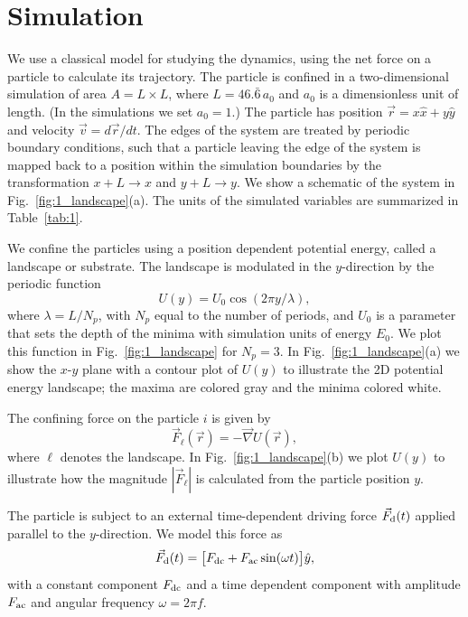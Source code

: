 \documentclass[preprint,showpacs,preprintnumbers,amsmath,amssymb,aps,prb]{revtex4-1}
\theoremstyle{remark}
\begin{document}
\section{Simulation}
\label{sec:MD}
We use a classical model for 
studying the dynamics, 
using the net force on a particle to calculate
its trajectory.
The particle is confined in a two-dimensional 
simulation of area $A = L \times L$, where $L=46.\bar{6}\,a_0$
and $a_0$ is a dimensionless unit of length. (In the simulations we   set $a_0 = 1$.)
The particle 
has
position $\vec{r} = x \hat{x} + y \hat{y}$
and velocity $\vec{v} = d\vec{r}/dt$.
The edges of the system are treated by
periodic boundary conditions,
such that a particle leaving the edge of the system is mapped
back to a position within the simulation boundaries 
by the transformation $x+L \rightarrow x$ and $y+L \rightarrow y$.
We show a schematic of the system in Fig.~\ref{fig:1_landscape}(a).
The units of the simulated variables are summarized in Table~\ref{tab:1}.

We confine the particles using a position dependent 
potential energy, called a landscape or substrate.
The landscape is modulated in the $y$-direction
by the periodic function 
 \begin{equation}
   U(y) = U_0 \cos{(2 \pi y / \lambda)},
     \label{eq:ysubstrate}
\end{equation}
where $\lambda=L/N_p$, with $N_p$ equal to the number of periods,
and $U_0$ is a parameter
 that sets the depth of the minima
 with simulation units of energy $E_0$. 
 We plot this function in 
 Fig.~\ref{fig:1_landscape}
 for $N_p = 3$.  In Fig.~\ref{fig:1_landscape}(a) we show 
 the $x$-$y$ plane with a contour plot of $U(y)$ 
 to illustrate
 the 2D potential energy landscape;
 the maxima are colored gray and the minima colored white.

The confining force on the particle $i$
 is given by
 \begin{equation}
 \vec{F}_{\ell}(\vec{r}) = - \vec \nabla U(\vec{r}),
 \label{eq:dudr}
 \end{equation}
where $\ell$ denotes the landscape.
 In Fig.~\ref{fig:1_landscape}(b) we plot  
 $U(y)$ to illustrate how the magnitude
 $|\vec{F}_{\ell}|$ is calculated from the particle position $y$.
 
The particle is subject to an external time-dependent driving force
$\vec{F}_{\rm d}(t)$
applied parallel to the $y$-direction.
We model this force as
\begin{equation}
  \vec{F}_{\rm d}(t) = \big [F_{\rm dc} + F_{\rm ac} \sin(\omega t)\big] \hat{y},
    \label{eq:drive}
\end{equation}
with 
a constant component $F_{\rm dc}$
and a time dependent component with amplitude $F_{\rm ac}$
and angular frequency $\omega = 2 \pi f$.
\end{document}
